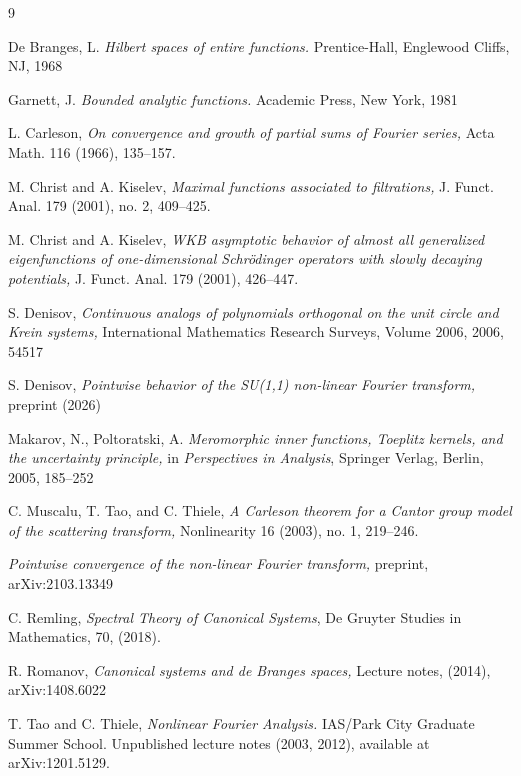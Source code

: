 \documentclass[11pt,twoside,reqno]{amsart}
\theoremstyle{plain}
\numberwithin{equation}{section}
\begin{document}
\begin{thebibliography}{9}

      {\sc De Branges, L.} {\it Hilbert spaces of entire functions.} Prentice-Hall,
Englewood Cliffs, NJ, 1968

 {\sc Garnett, J.} {\it Bounded analytic functions.} Academic Press, New York, 1981

 {\sc L. Carleson,} {\it On convergence and growth of partial sums of Fourier series,} Acta Math. 116 (1966), 135--157.

 {\sc M. Christ and A. Kiselev,} {\it Maximal functions associated to filtrations,} J. Funct. Anal. 179 (2001), no. 2, 409--425.

 {\sc M. Christ and A. Kiselev,} {\it WKB asymptotic behavior of almost all generalized eigenfunctions of one-dimensional Schr\"odinger operators with slowly decaying potentials,} J. Funct. Anal. 179 (2001), 426--447.

 {\sc S. Denisov}, {\it Continuous analogs of polynomials orthogonal on the unit circle and Krein systems,}
International Mathematics Research Surveys, Volume 2006, 2006, 54517

 {\sc S. Denisov}, {\it Pointwise behavior of the SU(1,1) non-linear Fourier transform,} preprint (2026)

 {\sc  Makarov, N.,  Poltoratski, A.} {\it Meromorphic inner functions, Toeplitz kernels, and the uncertainty principle,} in {\it Perspectives in Analysis}, Springer Verlag, Berlin, 2005, 185--252

 {\sc C. Muscalu, T. Tao, and C. Thiele,} {\it A Carleson theorem for a Cantor group model of the scattering transform,} Nonlinearity 16 (2003), no. 1, 219--246.

 {\it Pointwise convergence of the non-linear Fourier transform,} preprint, arXiv:2103.13349

 {\sc C. Remling,} {\it
Spectral Theory of Canonical Systems}, De Gruyter Studies in Mathematics, 70, (2018).

 {\sc R. Romanov,} {\it Canonical systems and de Branges spaces,} Lecture notes, (2014), arXiv:1408.6022

 {\sc T. Tao and C. Thiele,} {\it Nonlinear Fourier Analysis.} IAS/Park City Graduate Summer School. Unpublished
lecture notes (2003, 2012), available at arXiv:1201.5129.

\end{thebibliography}
\end{document}
